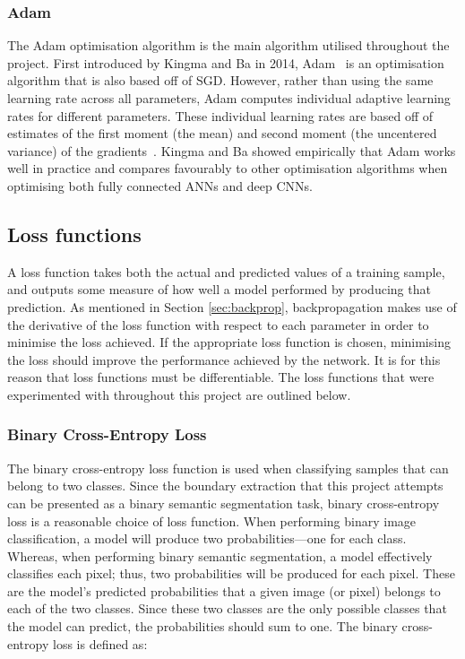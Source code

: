 \subsubsection{Adam}

The Adam optimisation algorithm is the main algorithm utilised throughout the project. First introduced by Kingma and Ba in 2014, Adam~\cite{adam} is an optimisation algorithm that is also based off of SGD. However, rather than using the same learning rate across all parameters, Adam computes individual adaptive learning rates for different parameters. These individual learning rates are based off of estimates of the first moment (the mean) and second moment (the uncentered variance) of the gradients~\cite{gdbad}. Kingma and Ba showed empirically that Adam works well in practice and compares favourably to other optimisation algorithms when optimising both fully connected ANNs and deep CNNs.

\subsection{Loss functions}
\label{sec:loss}

A loss function takes both the actual and predicted values of a training sample, and outputs some measure of how well a model performed by producing that prediction. As mentioned in Section \ref{sec:backprop}, backpropagation makes use of the derivative of the loss function with respect to each parameter in order to minimise the loss achieved. If the appropriate loss function is chosen, minimising the loss should improve the performance achieved by the network. It is for this reason that loss functions must be differentiable. The loss functions that were experimented with throughout this project are outlined below.

\subsubsection{Binary Cross-Entropy Loss}

The binary cross-entropy loss function is used when classifying samples that can belong to two classes. Since the boundary extraction that this project attempts can be presented as a binary semantic segmentation task, binary cross-entropy loss is a reasonable choice of loss function. When performing binary image classification, a model will produce two probabilities---one for each class. Whereas, when performing binary semantic segmentation, a model effectively classifies each pixel; thus, two probabilities will be produced for each pixel. These are the model's predicted probabilities that a given image (or pixel) belongs to each of the two classes. Since these two classes are the only possible classes that the model can predict, the probabilities should sum to one. The binary cross-entropy loss is defined as:


